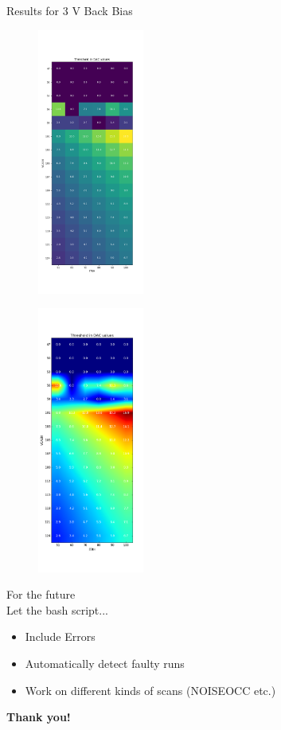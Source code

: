 \begin{frame}{Results for 3 V Back Bias}
    \begin{minipage}{.49\textwidth}
    \begin{figure}[H]
	\centering
	\includegraphics[width=3.5cm]{../bb3_Heatmap.png}
    \end{figure}
    \end{minipage}
    \begin{minipage}{.49\textwidth}
    \begin{figure}[H]
	\centering
	\includegraphics[width=3.5cm]{../bb3_Heatmap_soft.png}
    \end{figure}
    \end{minipage}
\end{frame}

\begin{frame}
    \Large For the future \\[.5cm]
    \normalsize Let the bash script...
    \begin{itemize}
	\item Include Errors
	    \pause
	\item Automatically detect faulty runs
	    \pause
	\item Work on different kinds of scans (NOISEOCC etc.)\\[1cm]
    \end{itemize}
    \pause
    \centering \huge \color{blue!30!black} \textbf{Thank you!}
\end{frame}
